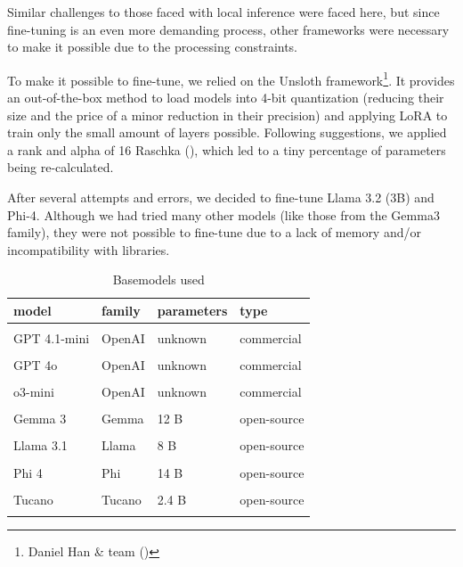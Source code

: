 \documentclass[
  12pt,
]{article}
\begin{document}
Similar challenges to those faced with local inference were faced here,
but since fine-tuning is an even more demanding process, other
frameworks were necessary to make it possible due to the processing
constraints.

To make it possible to fine-tune, we relied on the Unsloth
framework\footnote{Daniel Han \& team
  ()}. It provides an
out-of-the-box method to load models into 4-bit quantization (reducing
their size and the price of a minor reduction in their precision) and
applying LoRA to train only the small amount of layers possible.
Following suggestions, we applied a rank and alpha of 16 Raschka
(), which led to a tiny
percentage of parameters being re-calculated.

After several attempts and errors, we decided to fine-tune Llama 3.2
(3B) and Phi-4. Although we had tried many other models (like those from
the Gemma3 family), they were not possible to fine-tune due to a lack of
memory and/or incompatibility with libraries.

\begin{longtable}[t]{llll}

\toprule
model & family & parameters & type\\
\midrule
\cellcolor{gray!10}{GPT 4.1} & \cellcolor{gray!10}{OpenAI} & \cellcolor{gray!10}{unknown} & \cellcolor{gray!10}{commercial}\\
GPT 4.1-mini & OpenAI & unknown & commercial\\
\cellcolor{gray!10}{GPT 4.1-nano} & \cellcolor{gray!10}{OpenAI} & \cellcolor{gray!10}{unknown} & \cellcolor{gray!10}{commercial}\\
GPT 4o & OpenAI & unknown & commercial\\
\cellcolor{gray!10}{GPT 4o-mini} & \cellcolor{gray!10}{OpenAI} & \cellcolor{gray!10}{unknown} & \cellcolor{gray!10}{commercial}\\
\addlinespace
o3-mini & OpenAI & unknown & commercial\\
\cellcolor{gray!10}{Gemma 3} & \cellcolor{gray!10}{Gemma} & \cellcolor{gray!10}{27 B} & \cellcolor{gray!10}{open-source}\\
Gemma 3 & Gemma & 12 B & open-source\\
\cellcolor{gray!10}{Gemma 3} & \cellcolor{gray!10}{Gemma} & \cellcolor{gray!10}{1 B} & \cellcolor{gray!10}{open-source}\\
Llama 3.1 & Llama & 8 B & open-source\\
\addlinespace
\cellcolor{gray!10}{Llama 3.2} & \cellcolor{gray!10}{Llama} & \cellcolor{gray!10}{3 B} & \cellcolor{gray!10}{open-source}\\
Phi 4 & Phi & 14 B & open-source\\
\cellcolor{gray!10}{Lawma 8B} & \cellcolor{gray!10}{Lawma} & \cellcolor{gray!10}{8 B} & \cellcolor{gray!10}{open-source}\\
Tucano & Tucano & 2.4 B & open-source\\
\bottomrule


\caption{\label{tbl-metadata}Basemodels used}

\tabularnewline
\end{longtable}
\end{document}

